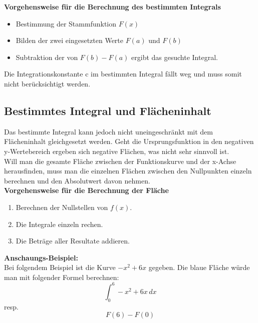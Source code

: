 \documentclass[12pt]{scrartcl}
\begin{document}
\noindent
\textbf{Vorgehensweise für die Berechnung des bestimmten Integrals} 
\begin{itemize}
    \item Bestimmung der Stammfunktion $F(x)$
    \item Bilden der zwei eingesetzten Werte $F(a)$ und $F(b)$
    \item Subtraktion der von $F(b) - F(a)$ ergibt das gesuchte Integral.
\end{itemize}
Die Integrationskonstante c im bestimmten Integral fällt weg und muss somit nicht
berücksichtigt werden.


\subsection{Bestimmtes Integral und Flächeninhalt}
Das bestimmte Integral kann jedoch nicht uneingeschränkt mit dem Flächeninhalt gleichgesetzt 
werden. Geht die Ursprungsfunktion in den negativen y-Wertebereich
ergeben sich negative Flächen, was nicht sehr sinnvoll ist.\\
\noindent
Will man die gesamte Fläche zwischen der Funktionskurve und der x-Achse herausfinden, muss man
die einzelnen Flächen zwischen den Nullpunkten einzeln berechnen und den Absolutwert
davon nehmen.\\

\noindent
\textbf{Vorgehensweise für die Berechnung der Fläche}
\begin{enumerate}
    \item Berechnen der Nullstellen von $f(x)$.
    \item Die Integrale einzeln rechen.
    \item Die Beträge aller Resultate addieren.
\end{enumerate}

\newpage

\noindent
\textbf{Anschaungs-Beispiel:} \\
Bei folgendem Beispiel ist die Kurve $-x^2 + 6x$ gegeben. Die blaue Fläche würde man mit folgender Formel
berechnen:
\[{\int_{0}^{6}  -x^2 + 6x\,dx }\]
resp.
\[F(6) - F(0)\]
\end{document}
